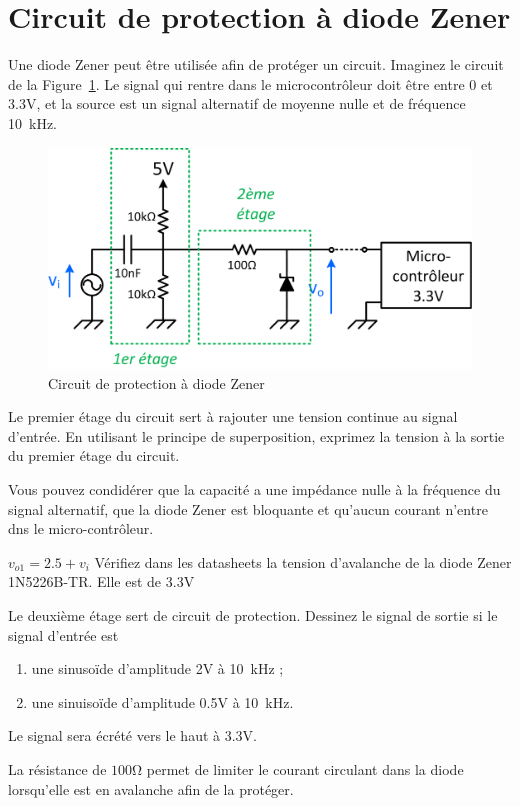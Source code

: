 \documentclass{../template/labo}
\begin{document}
\section{Circuit de protection à diode Zener}

Une diode Zener peut être utilisée afin de protéger un circuit. Imaginez le circuit de la Figure~\ref{fig:circuit_zener}. Le signal qui rentre dans le microcontrôleur doit être entre 0 et 3.3V, et la source est un signal alternatif de moyenne nulle et de fréquence 10~kHz. 
\begin{figure}[h!]
	\begin{center}
		\includegraphics{figures/circuit_zener.png}
	\end{center}
\caption{Circuit de protection à diode Zener}
\label{fig:circuit_zener}
\end{figure}


\begin{predet}

\Question
{Le premier étage du circuit sert à rajouter une tension continue au signal d'entrée. En utilisant le principe de superposition, exprimez la tension à la sortie du premier étage du circuit. 

Vous pouvez condidérer que la capacité a une impédance nulle à la fréquence du signal alternatif, que la diode Zener est bloquante et qu'aucun courant n'entre dns le micro-contrôleur. }
{$v_{o1}=2.5+v_i$}
\label{Q:zener_1}
\Question
{Vérifiez dans les datasheets la tension d'avalanche de la diode Zener 1N5226B-TR. }
{Elle est de 3.3V}
\label{Q:zener_2}
\Question
{Le deuxième étage sert de circuit de protection. Dessinez le signal de sortie si le signal d'entrée est 
\begin{enumerate}
	\item une sinusoïde d'amplitude 2V à 10~kHz ;
	\item une sinuisoïde d'amplitude 0.5V à 10~kHz.
\end{enumerate}
}
{Le signal sera écrété vers le haut à 3.3V. }
\label{Q:zener_3}

\end{predet}
\begin{info}
	La résistance de $100 \si{\ohm}$ permet de limiter le courant circulant dans la diode lorsqu'elle est en avalanche afin de la protéger.
\end{info}
\end{document}
